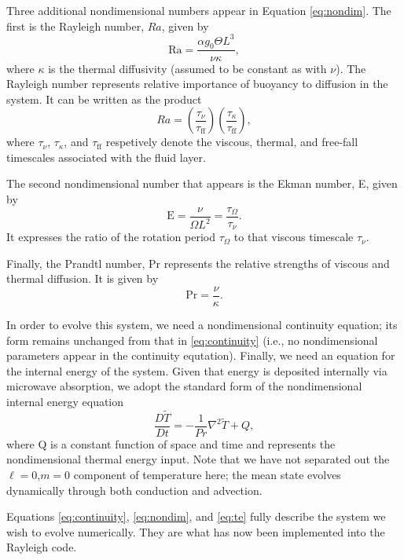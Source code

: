 Three additional nondimensional numbers appear in Equation \ref{eq:nondim}.  The first is the Rayleigh number, $Ra$, given by
\begin{equation}
\mathrm{Ra} = \frac{\alpha g_0 \Theta L^3}{\nu\kappa},
\end{equation}
where $\kappa$ is the thermal diffusivity (assumed to be constant as with $\nu$).  The Rayleigh number represents 
relative importance of buoyancy to diffusion in the system.  It can be written as the product
\begin{equation}
Ra=\left(\frac{\tau_{\nu}}{\tau_{\mathrm{ff}}}\right)\left(\frac{\tau_{\kappa}}{\tau_{\mathrm{ff}}}\right),
\end{equation} 
where $\tau_{\nu}$, $\tau_{\kappa}$, and $\tau_{\mathrm{ff}}$ respetively denote the viscous, thermal, and free-fall timescales associated with the fluid layer.

The second nondimensional number that appears is the Ekman number, E, given by
\begin{equation}
\mathrm{E} = \frac{\nu}{\Omega L^2} = \frac{\tau_\Omega}{\tau_\nu}.
\end{equation}
It expresses the ratio of the rotation period $\tau_\Omega$ to that viscous timescale $\tau_\nu$.

Finally, the Prandtl number, Pr represents the relative strengths of viscous and thermal diffusion.  It is given by
\begin{equation}
\mathrm{Pr} = \frac{\nu}{\kappa}.
\end{equation}

In order to evolve this system, we need a nondimensional continuity equation;  its form remains unchanged from that in \ref{eq:continuity} (i.e.,  no nondimensional parameters appear in the continuity equtation).  Finally, we need an equation for the internal energy of the system.  Given that energy is deposited internally via microwave absorption, we adopt the standard form of the nondimensional internal energy equation
\begin{equation}
\label{eq:te}
\frac{D\tilde{T}}{Dt}=-\frac{1}{Pr}\nabla^2\tilde{T} + Q,
\end{equation}
where Q is a constant function of space and time and represents the nondimensional thermal energy input.  Note that we have not separated out the $\ell=0$,$m=0$ component of temperature here;  the mean state evolves dynamically through both conduction and advection.

Equations \ref{eq:continuity}, \ref{eq:nondim}, and \ref{eq:te}  fully describe the system we wish to evolve numerically.  They are what has now been implemented into the Rayleigh code.

